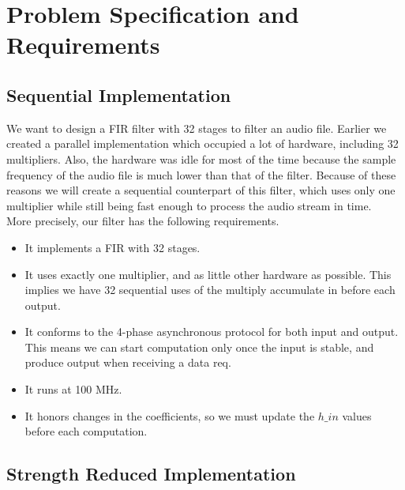 \section{Problem Specification and Requirements}
\subsection{Sequential Implementation}
We want to design a FIR filter with 32 stages to filter an audio file. Earlier we created a parallel implementation which occupied a lot of hardware, including 32 multipliers. Also, the hardware was idle for most of the time because the sample frequency of the audio file is much lower than that of the filter. Because of these reasons we will create a sequential counterpart of this filter, which uses only one multiplier while still being fast enough to process the audio stream in time. \\
More precisely, our filter has the following requirements.
\begin{itemize}
\item It implements a FIR with 32 stages.
\item It uses exactly one multiplier, and as little other hardware as possible. This implies we have 32 sequential uses of the multiply accumulate in before each output.
\item It conforms to the 4-phase asynchronous protocol for both input and output. This means we can start computation only once the input is stable, and produce output when receiving a data req.
\item It runs at 100 MHz. 
\item It honors changes in the coefficients, so we must update the $h\_in$ values before each computation.

\end{itemize}

\subsection{Strength Reduced Implementation}
